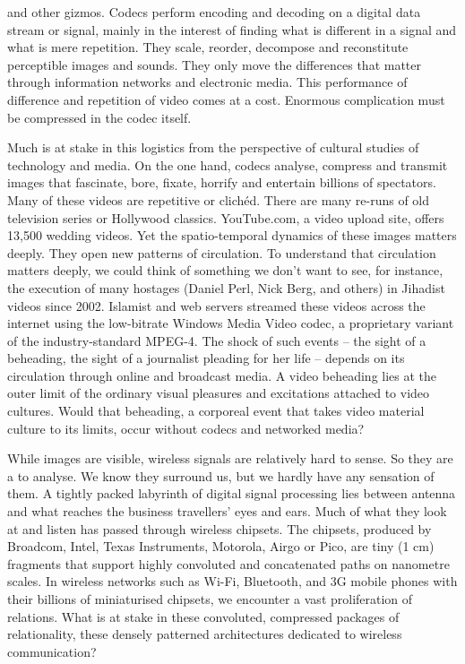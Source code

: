 {and other gizmos. Codecs perform encoding and decoding on a digital
data stream or signal, mainly in the interest of finding what is
different in a signal and what is mere repetition. They scale, reorder,
decompose and reconstitute perceptible images and sounds. They only
move the differences that matter through information networks and
electronic media. This performance of difference and repetition of
video comes at a cost. Enormous complication must be compressed in the
codec itself.\par Much is at stake in this logistics from the
perspective of cultural studies of technology and media. On the one
hand, codecs analyse, compress and transmit images that fascinate,
bore, fixate, horrify and entertain billions of spectators. Many of
these videos are repetitive or clich\'ed. There are many re{}-runs of
old television series or Hollywood classics. YouTube.com, a video
upload site, offers 13,500 wedding videos. Yet the spatio{}-temporal
dynamics of these images matters deeply. They open new patterns of
circulation. To understand that circulation matters deeply, we could
think of something we don't want to see, for instance, the execution of
many hostages (Daniel Perl, Nick Berg, and others) in Jihadist videos
since 2002. Islamist and  web servers streamed these
videos across the internet using the low{}-bitrate Windows Media Video
codec, a proprietary variant of the industry{}-standard MPEG{}-4. The
shock of such events {--} the sight of a beheading, the sight of a
journalist pleading for her life {--} depends on its circulation
through online and broadcast media. A video beheading lies at the outer
limit of the ordinary visual pleasures and excitations attached to
video cultures. Would that beheading, a corporeal event that takes
video material culture to its limits, occur without codecs and
networked media?}

While images are visible, wireless signals are
relatively hard to sense. So they are a  to analyse. We know
they surround us, but we hardly have any sensation of them. A tightly
packed labyrinth of digital signal processing lies between antenna and
what reaches the business travellers' eyes and ears. Much of what they
look at and listen has passed through wireless chipsets. The chipsets,
produced by Broadcom, Intel, Texas Instruments, Motorola, Airgo or
Pico, are tiny (1 cm) fragments that
support highly convoluted and concatenated paths on nanometre scales.
In wireless networks such as Wi{}-Fi, Bluetooth, and 3G mobile phones
with their billions of miniaturised chipsets, we encounter a vast
proliferation of relations. What is at stake in these convoluted,
compressed packages of relationality, these densely patterned
architectures dedicated to wireless communication? 

